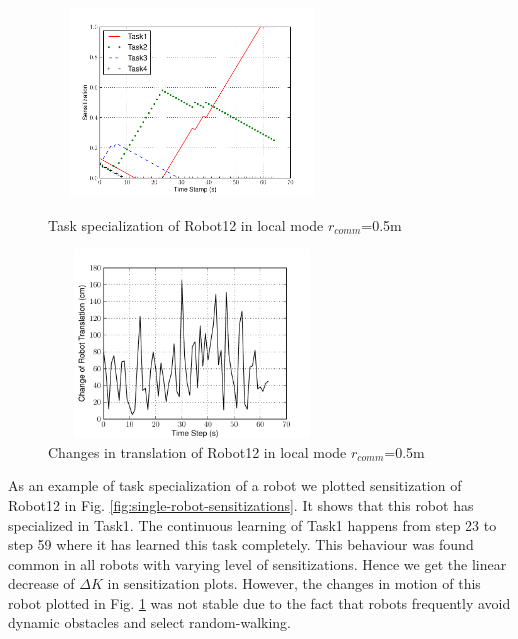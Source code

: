 \documentclass[letterpaper, 10 pt, times, conference]{ieeeconf} %
\begin{document}
\begin{figure}
\begin{minipage}[t]{0.5\linewidth}
\centering
\includegraphics[height=5cm,width=3in]{images/local-500cm/PlotRobot12-Sensitizations-2010Feb16-150432}
\caption{\small Task specialization of Robot12 in local mode $r_{comm}$=0.5m}
\label{fig:single-robot-sensitizations} %
\end{minipage} 
\begin{minipage}[t]{0.5\linewidth}
\centering
\includegraphics[height=5cm,width=3in]
{images/local-500cm/DeltaRobot12-PoseAtTS-2010Feb16-150432}
\caption{\small Changes in translation of Robot12 in local mode $r_{comm}$=0.5m}
\label{fig:single-robot-translation} %
\end{minipage}
\end{figure}
As an example of task specialization of a robot we plotted sensitization of Robot12 in Fig. \ref{fig:single-robot-sensitizations}. It shows that this robot has specialized in Task1. The continuous learning of Task1 happens from step 23 to step 59 where it has learned this task completely. This behaviour was found common in all robots with varying level of sensitizations. Hence we get the linear decrease of $\Delta K$ in sensitization plots. However, the changes in motion of this robot plotted in Fig. \ref{fig:single-robot-translation} was not stable due to the fact that robots frequently avoid dynamic obstacles and select random-walking.
%
\end{document}
